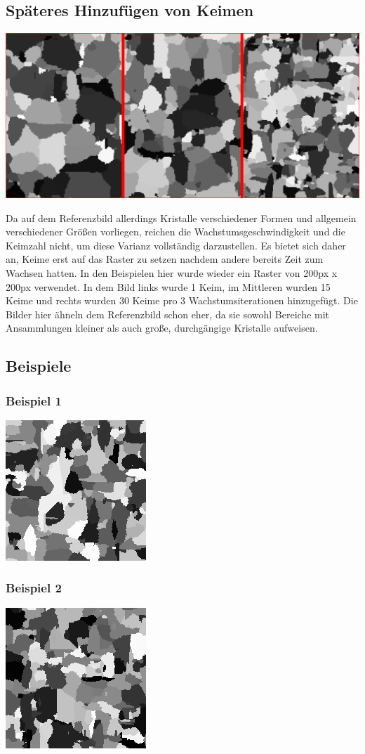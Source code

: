\documentclass[a4paper,10pt,ngerman]{scrartcl}
\begin{document}
\subsection{Späteres Hinzufügen von Keimen}
\centerline{\includegraphics{collage1}}
Da auf dem Referenzbild allerdings Kristalle verschiedener Formen und allgemein verschiedener Größen vorliegen, reichen die Wachstumsgeschwindigkeit und die Keimzahl nicht, um diese Varianz vollständig darzustellen. Es bietet sich daher an, Keime erst auf das Raster zu setzen nachdem andere bereits Zeit zum Wachsen hatten.
In den Beispielen hier wurde wieder ein Raster von 200px x 200px verwendet. In dem Bild links wurde 1 Keim, im Mittleren wurden 15 Keime und rechts wurden 30 Keime pro 3 Wachstumsiterationen hinzugefügt. Die Bilder hier ähneln dem Referenzbild schon eher, da sie sowohl Bereiche mit Ansammlungen kleiner als auch große, durchgängige Kristalle aufweisen.
\subsection{Beispiele}
\subsubsection{Beispiel 1}
\centerline{\includegraphics{beispiel1}}
\subsubsection{Beispiel 2}
\centerline{\includegraphics{beispiel2}}
\end{document}
